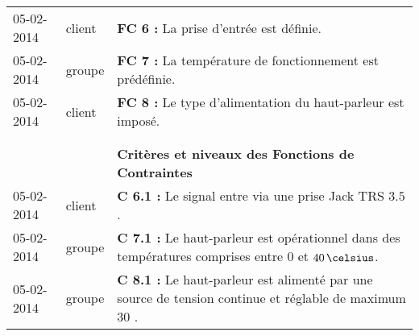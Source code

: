 \begin{table}
\begin{changemargin}{-2cm}{2cm}
\begin{tabular}{|p{2cm}|p{1.5cm}|p{13cm}|}
		05-02-2014 & client & \textbf{FC 6 :} La prise d’entrée est définie.\\

		05-02-2014 & groupe & \textbf{FC 7 :} La température de fonctionnement est prédéfinie.\\
	
		05-02-2014 & client & \textbf{FC 8 :} Le type d’alimentation du haut-parleur est imposé.\\
	 & &\\
\hline
	& &\\
		& & \textbf{ Critères et niveaux des Fonctions de Contraintes}\\

	 	05-02-2014 & client & \textbf{C 6.1 :} Le signal entre via une prise Jack TRS $3.5$ \milli \meter.\\

		05-02-2014 & groupe & \textbf{C 7.1 :} Le haut-parleur est opérationnel dans des températures comprises entre $0$ et $40\,\celsius$.\\
	
		05-02-2014 & groupe & \textbf{C 8.1 :} Le haut-parleur est alimenté par une source de tension continue et réglable de maximum $30$ \volt.\\
	
\hline
 \end{tabular}
 \end{changemargin}
  \end{table}

